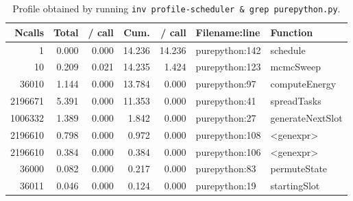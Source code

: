 \documentclass{prettytex/ox/mmsc-special-topic}
\begin{document}
  \begin{table}[H]
    \centering
    \caption{Profile obtained by running \texttt{inv profile-scheduler & grep purepython.py}.}
    \begin{tabular}{rrrrrll}
      \hline
      \bf Ncalls & \bf Total & \bf / call & \bf Cum. & \bf / call & \bf Filename:line & \bf Function     \\
      \hline
      1          & 0.000     & 0.000      & 14.236   & 14.236     & purepython:142    & schedule         \\
      10         & 0.209     & 0.021      & 14.235   & 1.424      & purepython:123    & mcmcSweep        \\
      36010      & 1.144     & 0.000      & 13.784   & 0.000      & purepython:97     & computeEnergy    \\
      2196671    & 5.391     & 0.000      & 11.353   & 0.000      & purepython:41     & spreadTasks      \\
      1006332    & 1.389     & 0.000      & 1.842    & 0.000      & purepython:27     & generateNextSlot \\
      2196610    & 0.798     & 0.000      & 0.972    & 0.000      & purepython:108    & <genexpr>        \\
      2196610    & 0.384     & 0.000      & 0.384    & 0.000      & purepython:106    & <genexpr>        \\
      36000      & 0.082     & 0.000      & 0.217    & 0.000      & purepython:83     & permuteState     \\
      36011      & 0.046     & 0.000      & 0.124    & 0.000      & purepython:19     & startingSlot     \\
    \end{tabular}
  \end{table}
\end{document}

